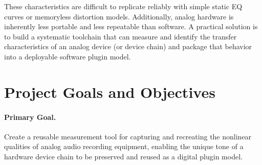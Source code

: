 \documentclass[11pt, letterpaper]{article}
\begin{document}
These characteristics are difficult to replicate reliably with simple static EQ curves or memoryless
distortion models. Additionally, analog hardware is inherently less portable and less repeatable
than software. A practical solution is to build a systematic toolchain that can measure and identify
the transfer characteristics of an analog device (or device chain) and package that behavior into a
deployable software plugin model.

\section{Project Goals and Objectives}
\label{sec:goals}

\paragraph{Primary Goal.}
Create a reusable measurement tool for capturing and recreating the nonlinear qualities of analog
audio recording equipment, enabling the unique tone of a hardware device chain to be preserved
and reused as a digital plugin model.
\end{document}
